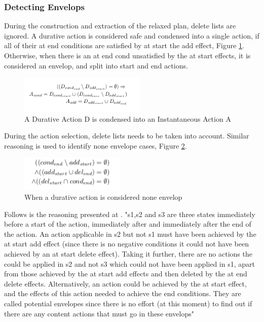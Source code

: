 \documentclass
[a4paper
,english
,parskip=half
,bibliography=totoc
]{scrreprt}
\begin{document}
        \subsubsection{Detecting Envelops}
        During the construction and extraction of the relaxed plan, delete lists are ignored. A durative action is considered safe and condensed into a single action, if all of their at end conditions are satisfied by at start the add effect, Figure \ref{fig:none_env_rpg}. Otherwise, when there is an at end cond unsatisfied by the at start effects, it is considered an envelop, and split into start and end actions.
         \begin{figure}[h]
            \centering    
            \includegraphics[width=6cm]{env_RPG.png}
            \caption{A Durative Action D is condensed into an Instantaneous Action A}
             \label{fig:none_env_rpg}
        \end{figure}


        During the action selection, delete lists needs to be taken into account. Similar reasoning is used to identify none envelope cases, Figure \ref{fig:none_env_selection}.
          \begin{figure}[h]
            \centering    
            \includegraphics[width=5cm]{env_selection.png}
            \caption{When a durative action is considered none envelop}
             \label{fig:none_env_selection}
        \end{figure}

         Follows is the reasoning presented at \citep{crikey_1}. "s1,s2 and s3 are three states immediately before a start of the action, immediately after and immediately after the end of the action. An action applicable in s2 but not s1 must have been achieved by the at start add effect (since there is no negative conditions it could not have been achieved by an at start delete effect). Taking it further, there are no actions the could be applied in s2 and not s3 which could not have been applied in s1, apart from those achieved by the at start add effects and then deleted by the at end delete effects. Alternatively, an action could be achieved by the at start effect, and the effects of this action needed to achieve the end conditions. They are called potential envelopes since there is no effort (at this moment) to find out if there are any content actions that must go in these envelops"
\end{document}

